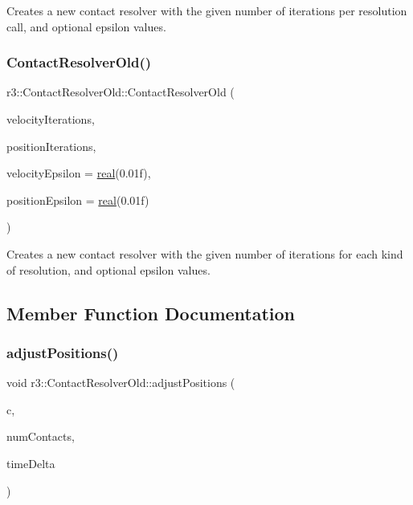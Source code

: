 Creates a new contact resolver with the given number of iterations per resolution call, and optional epsilon values. \mbox{\label{classr3_1_1_contact_resolver_old_a9f10b1a0e16f606009acd1b7aa4c323e}} 
\subsubsection{\texorpdfstring{Contact\+Resolver\+Old()}{ContactResolverOld()}\hspace{0.1cm}{\footnotesize\ttfamily [2/2]}}
{\footnotesize\ttfamily r3\+::\+Contact\+Resolver\+Old\+::\+Contact\+Resolver\+Old (\begin{DoxyParamCaption}\item[{unsigned}]{velocity\+Iterations,  }\item[{unsigned}]{position\+Iterations,  }\item[{\mbox{\hyperlink{namespacer3_ab2016b3e3f743fb735afce242f0dc1eb}{real}}}]{velocity\+Epsilon = {\ttfamily \mbox{\hyperlink{namespacer3_ab2016b3e3f743fb735afce242f0dc1eb}{real}}(0.01f)},  }\item[{\mbox{\hyperlink{namespacer3_ab2016b3e3f743fb735afce242f0dc1eb}{real}}}]{position\+Epsilon = {\ttfamily \mbox{\hyperlink{namespacer3_ab2016b3e3f743fb735afce242f0dc1eb}{real}}(0.01f)} }\end{DoxyParamCaption})}

Creates a new contact resolver with the given number of iterations for each kind of resolution, and optional epsilon values. 

\subsection{Member Function Documentation}
\mbox{\label{classr3_1_1_contact_resolver_old_ae0e628862589a4075945d0171a05cba4}} 
\subsubsection{\texorpdfstring{adjust\+Positions()}{adjustPositions()}}
{\footnotesize\ttfamily void r3\+::\+Contact\+Resolver\+Old\+::adjust\+Positions (\begin{DoxyParamCaption}\item[{\mbox{\hyperlink{classr3_1_1_contact_old}{Contact\+Old}} $\ast$}]{c,  }\item[{unsigned}]{num\+Contacts,  }\item[{\mbox{\hyperlink{namespacer3_ab2016b3e3f743fb735afce242f0dc1eb}{real}}}]{time\+Delta }\end{DoxyParamCaption})}

